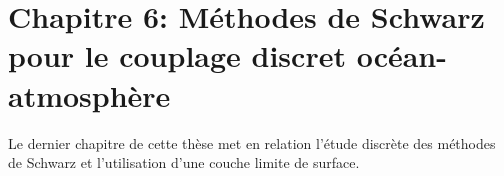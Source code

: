 \section*{Chapitre 6: Méthodes de Schwarz pour le couplage
discret océan-atmosphère}
Le dernier chapitre de cette thèse met en relation l'étude discrète
des méthodes de Schwarz et l'utilisation d'une couche limite de
surface.

